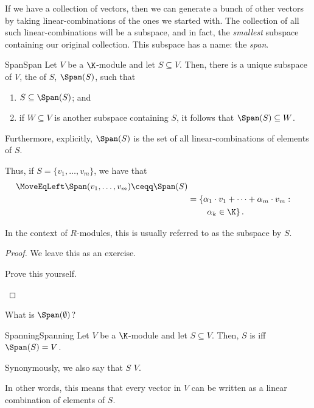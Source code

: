 If we have a collection of vectors, then we can generate a bunch of other vectors by taking linear-combinations of the ones we started with.  The collection of all such linear-combinations will be a subspace, and in fact, the \emph{smallest} subspace containing our original collection.  This subspace has a name:  the \emph{span}.
\begin{thm}{Span}{Span}
	Let $V$ be a $\K$-module and let $S\subseteq V$.  Then, there is a unique subspace of $V$, the  of $S$, $\Span (S)$, such that
	\begin{enumerate}
		\item $S\subseteq \Span (S)$; and
		\item if $W\subseteq V$ is another subspace containing $S$, it follows that $\Span (S)\subseteq W$.
	\end{enumerate}
	Furthermore, explicitly, $\Span (S)$ is the set of all linear-combinations of elements of $S$.
	\begin{rmk}
		Thus, if $S=\{ v_1,\ldots ,v_m\}$, we have that
		\begin{equation}
			\begin{split}
				\MoveEqLeft
				\Span (v_1,\ldots ,v_m)\ceqq \Span (S) \\
				& =\left\{ \alpha _1\cdot v_1+\cdots +\alpha _m\cdot v_m:\right. \\ & \qquad \left. \alpha _k\in \K \right\} .
			\end{split}
		\end{equation}
	\end{rmk}
	\begin{rmk}
		In the context of $R$-modules, this is usually referred to as the subspace  by $S$.
	\end{rmk}
	\begin{proof}
		We leave this as an exercise.
		\begin{exr}[breakable=false]{}{}
			Prove this yourself.
		\end{exr}
	\end{proof}
\end{thm}
\begin{exr}{}{}
	What is $\Span (\emptyset )$?
\end{exr}
\begin{dfn}{Spanning}{Spanning}
	Let $V$ be a $\K$-module and let $S\subseteq V$.  Then, $S$ is  iff $\Span (S)=V$.
	\begin{rmk}
		Synonymously, we also say that $S$  $V$.
	\end{rmk}
	\begin{rmk}
		In other words, this means that every vector in $V$ can be written as a linear combination of elements of $S$.
	\end{rmk}
\end{dfn}


